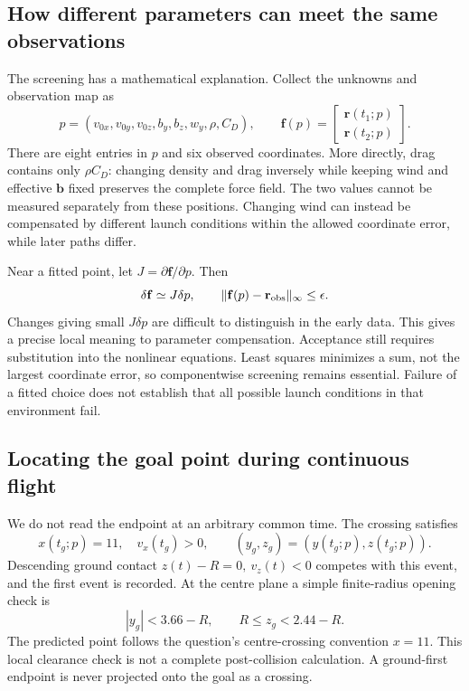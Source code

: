 \documentclass[11pt,a4paper]{article}
\begin{document}
\subsection{How different parameters can meet the same observations}
The screening has a mathematical explanation. Collect the unknowns and observation map as
\begin{equation}
p=(v_{0x},v_{0y},v_{0z},b_y,b_z,w_y,\rho,C_D),\qquad
\mathbf f(p)=\begin{bmatrix}\mathbf r(t_1;p)\\\mathbf r(t_2;p)\end{bmatrix}.
\end{equation}
There are eight entries in $p$ and six observed coordinates. More directly, drag contains only $\rho C_D$: changing density and drag inversely while keeping wind and effective $\mathbf b$ fixed preserves the complete force field. The two values cannot be measured separately from these positions. Changing wind can instead be compensated by different launch conditions within the allowed coordinate error, while later paths differ.

Near a fitted point, let $J=\partial\mathbf f/\partial p$. Then
\begin{equation}
\delta\mathbf f\simeq J\delta p,\qquad
\|\mathbf f(p)-\mathbf r_{\rm obs}\|_\infty\le\epsilon.
\end{equation}
Changes giving small $J\delta p$ are difficult to distinguish in the early data. This gives a precise local meaning to parameter compensation. Acceptance still requires substitution into the nonlinear equations. Least squares minimizes a sum, not the largest coordinate error, so componentwise screening remains essential. Failure of a fitted choice does not establish that all possible launch conditions in that environment fail.
\subsection{Locating the goal point during continuous flight}
We do not read the endpoint at an arbitrary common time. The crossing satisfies
\begin{equation}
x(t_g;p)=11,\quad v_x(t_g)>0,\qquad
(y_g,z_g)=(y(t_g;p),z(t_g;p)).
\label{eq:goal}
\end{equation}
Descending ground contact $z(t)-R=0,\ v_z(t)<0$ competes with this event, and the first event is recorded. At the centre plane a simple finite-radius opening check is
\begin{equation}
|y_g|<3.66-R,\qquad R\le z_g<2.44-R.
\end{equation}
The predicted point follows the question's centre-crossing convention $x=11$. This local clearance check is not a complete post-collision calculation. A ground-first endpoint is never projected onto the goal as a crossing.
\end{document}
